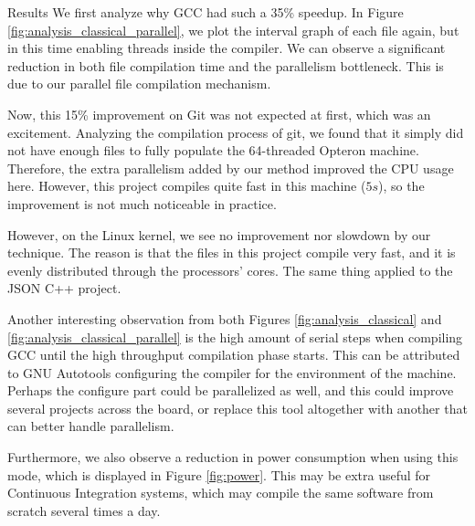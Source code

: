 \begin{subsection}{Results}
We first analyze why GCC had such a 35\% speedup. In Figure
\ref{fig:analysis_classical_parallel}, we plot the interval graph of each file
again, but in this time enabling threads inside the compiler. We can observe a
significant reduction in both file compilation time and the parallelism bottleneck.
This is due to our parallel file compilation mechanism. 

Now, this 15\% improvement on Git was not expected at first, which was an
excitement. Analyzing the compilation process of git, we found that it simply
did not have enough files to fully populate the 64-threaded Opteron machine.
Therefore, the extra parallelism added by our method improved the CPU usage
here.  However, this project compiles quite fast in this machine ($5s$), so the
improvement is not much noticeable in practice.

However, on the Linux kernel, we see no improvement nor slowdown by our
technique. The reason is that the files in this project compile very fast, and
it is evenly distributed through the processors' cores. The same thing applied
to the JSON C++ project.

Another interesting observation from both Figures \ref{fig:analysis_classical} and
\ref{fig:analysis_classical_parallel} is the high amount of serial steps when
compiling GCC until the high throughput compilation phase starts. This can be
attributed to GNU Autotools configuring the compiler for the environment of the
machine. Perhaps the configure part could be parallelized as well, and this
could improve several projects across the board, or replace this tool
altogether with another that can better handle parallelism.

Furthermore, we also observe a reduction in power consumption when using this
mode, which is displayed in Figure \ref{fig:power}. This may be extra useful for Continuous Integration systems, which
may compile the same software from scratch several times a day.


\end{subsection}
